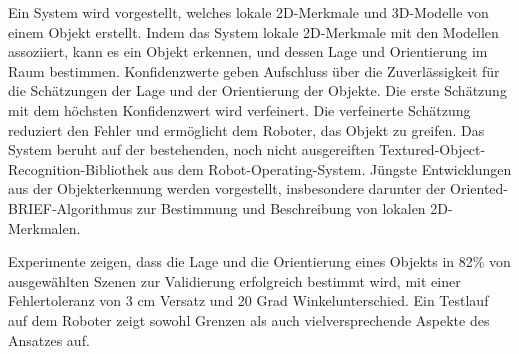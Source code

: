 Ein System wird vorgestellt, welches lokale 2D-Merkmale und 3D-Modelle von
einem Objekt erstellt. Indem das System lokale 2D-Merkmale mit den Modellen
assoziiert, kann es ein Objekt erkennen, und dessen Lage und Orientierung im
Raum bestimmen. Konfidenzwerte geben Aufschluss über die Zuverlässigkeit für
die Schätzungen der Lage und der Orientierung der Objekte.  Die erste Schätzung
mit dem höchsten Konfidenzwert wird verfeinert. Die verfeinerte Schätzung
reduziert den Fehler und ermöglicht dem Roboter, das Objekt zu greifen. Das
System beruht auf der bestehenden, noch nicht ausgereiften
Textured-Object-Recognition-Bibliothek aus dem Robot-Operating-System.  Jüngste
Entwicklungen aus der Objekterkennung werden vorgestellt, insbesondere darunter
der Oriented-BRIEF-Algorithmus zur Bestimmung und Beschreibung von lokalen
2D-Merkmalen.

Experimente zeigen, dass die Lage und die Orientierung eines Objekts in 82\%
von ausgewählten Szenen zur Validierung erfolgreich bestimmt wird, mit einer
Fehlertoleranz von 3 cm Versatz und 20 Grad Winkelunterschied. Ein Testlauf auf
dem Roboter zeigt sowohl Grenzen als auch vielversprechende Aspekte des
Ansatzes auf.


